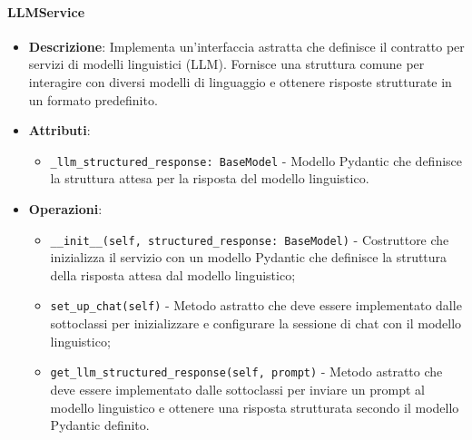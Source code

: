 \documentclass[10pt]{article}
\begin{document}
    \paragraph{LLMService}
    \begin{itemize} 
    \item \textbf{Descrizione}: Implementa un'interfaccia astratta che definisce il contratto per servizi di modelli linguistici (LLM). Fornisce una struttura comune per interagire con diversi modelli di linguaggio e ottenere risposte strutturate in un formato predefinito.
    \item \textbf{Attributi}:
    \begin{itemize}
        \item \texttt{\_llm\_structured\_response: BaseModel} - Modello Pydantic che definisce la struttura attesa per la risposta del modello linguistico.
    \end{itemize}
    
    \item \textbf{Operazioni}:
    \begin{itemize}
        \item \texttt{\_\_init\_\_(self, structured\_response: BaseModel)} - Costruttore che inizializza il servizio con un modello Pydantic che definisce la struttura della risposta attesa dal modello linguistico;
        
        \item \texttt{set\_up\_chat(self)} - Metodo astratto che deve essere implementato dalle sottoclassi per inizializzare e configurare la sessione di chat con il modello linguistico;
        
        \item \texttt{get\_llm\_structured\_response(self, prompt)} - Metodo astratto che deve essere implementato dalle sottoclassi per inviare un prompt al modello linguistico e ottenere una risposta strutturata secondo il modello Pydantic definito.
    \end{itemize}
    \end{itemize}
\end{document}
